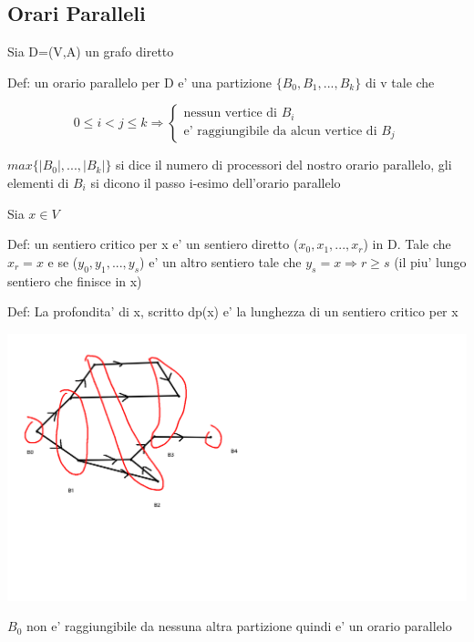 \documentclass{article}
\begin{document}
        \subsection{Orari Paralleli}
        \begin{flushleft}
          Sia D=(V,A) un grafo diretto
        \end{flushleft}
        \begin{flushleft}
          Def: un orario parallelo per D e' una partizione $\{B_0,B_1,...,B_k\}$ di v tale che 
        \end{flushleft}
        \begin{equation*}
          0 \leq i < j \leq k \Rightarrow \begin{cases}
            \text{nessun vertice di $B_i$} \\ 
            \text{e' raggiungibile da alcun vertice di $B_j$}
          \end{cases}
        \end{equation*}
        \begin{flushleft}
          $max\{\mid B_0\mid ,...,\mid B_k\mid \}$ si dice il numero di processori del nostro orario parallelo,
          gli elementi di $B_i$ si dicono il passo i-esimo dell'orario parallelo
        \end{flushleft}
        Sia $x \in V$
        \begin{flushleft}
          Def: un sentiero critico per x e' un sentiero diretto ($x_0,x_1,...,x_r$) in D. Tale che $x_r=x$ e se ($y_0,y_1,...,y_s$) e' 
          un altro sentiero tale che $y_s=x\Rightarrow r \geq s$
          (il piu' lungo sentiero che finisce in x)
        \end{flushleft}
        \begin{flushleft}
          Def: La profondita' di x, scritto dp(x) e' la lunghezza di un sentiero critico per x
        \end{flushleft}
        \includegraphics[bb=0 0 400 200]{pic/esorari.png}
        \begin{flushleft}
          $B_0$ non e' raggiungibile da nessuna altra partizione quindi e' un orario parallelo
        \end{flushleft}
\end{document}
